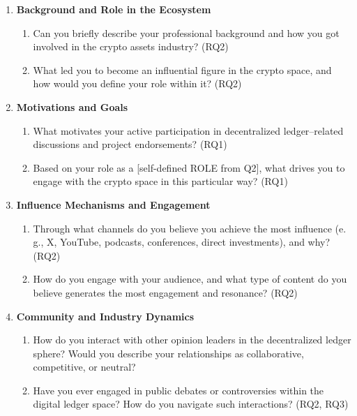 \begin{enumerate}[label=\textbf{\arabic*.}, leftmargin=8mm, nosep]
  \item \textbf{Background and Role in the Ecosystem}
  \begin{enumerate}[label=Q\arabic*., leftmargin=8mm, start=1, nosep]
    \item Can you briefly describe your professional background and how you got involved in the crypto assets industry? \hfill{(RQ2)}
    \item What led you to become an influential figure in the crypto space, and how would you define your role within it? \hfill{(RQ2)}
  \end{enumerate}
  \item \textbf{Motivations and Goals}
  \begin{enumerate}[label=Q\arabic*., leftmargin=8mm, start=3, nosep]
    \item What motivates your active participation in decentralized ledger–related discussions and project endorsements? \hfill{(RQ1)}
    \item Based on your role as a [self-defined ROLE from Q2], what drives you to engage with the crypto space in this particular way? \hfill{(RQ1)}
  \end{enumerate}
  \item \textbf{Influence Mechanisms and Engagement}
  \begin{enumerate}[label=Q\arabic*., leftmargin=8mm, start=5, nosep]
    \item Through what channels do you believe you achieve the most influence (e.\,g., X, YouTube, podcasts, conferences, direct investments), and why? \hfill{(RQ2)}
    \item How do you engage with your audience, and what type of content do you believe generates the most engagement and resonance? \hfill{(RQ2)}
  \end{enumerate}
  \item \textbf{Community and Industry Dynamics}
  \begin{enumerate}[label=Q\arabic*., leftmargin=8mm, start=7, nosep]
    \item How do you interact with other opinion leaders in the decentralized ledger sphere? Would you describe your relationships as collaborative, competitive, or neutral?\hfill
    \item Have you ever engaged in public debates or controversies within the digital ledger space? How do you navigate such interactions? \hfill{(RQ2, RQ3)}

\end{enumerate}
\end{enumerate}
